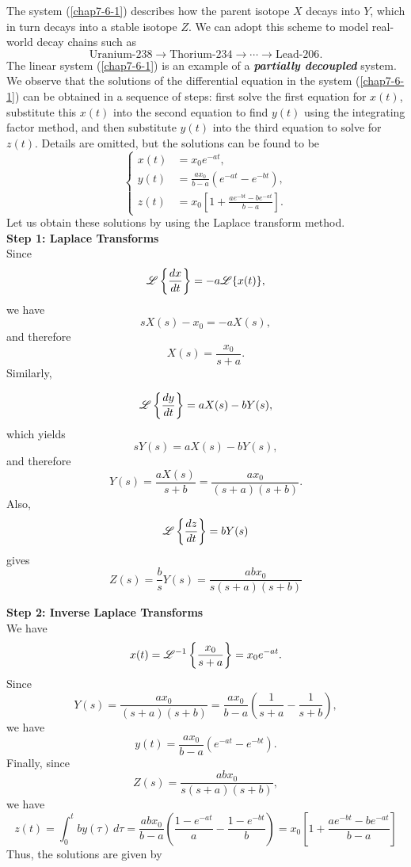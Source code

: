 The system (\ref{chap7-6-1}) describes how the parent isotope \( X \) decays into \( Y \), which in turn decays into a stable isotope \( Z \). We can adopt this scheme to model real-world decay chains such as
\[
\text{Uranium-238} \rightarrow \text{Thorium-234}\rightarrow\cdots \rightarrow \text{Lead-206}.
\]
The linear system (\ref{chap7-6-1}) is an example of a \textbf{\textit{partially decoupled}} system. 
We observe that the  solutions of the differential equation in the system (\ref{chap7-6-1}) can be obtained in a sequence of steps: first solve the first equation for $x(t)$, substitute this $x(t)$ into the second equation to find $y(t)$ using the integrating factor method, and then substitute $y(t)$ into the third equation to solve for $z(t)$. Details are omitted, but the solutions can be found to be 
\[
	\begin{cases}
		x(t) &= x_0 e^{-a t}, \\[6pt]
		y(t) &= \frac{a x_0}{b - a} \left( e^{-a t} - e^{-b t} \right), \\[6pt]
		z(t) &= x_0 \left[ 1 + \frac{a e^{-b t} - b e^{-a t}}{b - a} \right].
	\end{cases}
\]
Let us obtain these solutions  by using the Laplace transform method.\\


\noindent\textbf{Step 1: Laplace Transforms}\\
Since
\[
	\mathscr{L}\left\{\frac{dx}{dt}\right\} = -a \mathscr{L}\{x(t)\},\] we have
	 \[s X(s) - x_0 = -a X(s),\] and therefore
 \[X(s) = \frac{x_0}{s + a}.\]
Similarly,
	
	\[\mathscr{L}\left\{\frac{dy}{dt}\right\} = a X(s) - b Y(s),\] which yields
	\[ s Y(s) = a X(s) - b Y(s),\] and therefore
\[Y(s) = \frac{a X(s)}{s + b} = \frac{a x_0}{(s + a)(s + b)}.\] 
Also, 
	\[\mathscr{L}\left\{\frac{dz}{dt}\right\} = b Y(s)\]  gives
	\[ Z(s) = \frac{b}{s} Y(s) = \frac{a b x_0}{s(s + a)(s + b)}\]


\noindent\textbf{Step 2: Inverse Laplace Transforms}\\
We have
\[
x(t) = \mathscr{L}^{-1}\left\{\frac{x_0}{s + a}\right\} = x_0 e^{-a t}.
\]
Since
\[
Y(s) = \frac{a x_0}{(s + a)(s + b)} 
= \frac{a x_0}{b - a} \left( \frac{1}{s + a} - \frac{1}{s + b} \right),\] we have
\[ y(t) = \frac{a x_0}{b - a} \left( e^{-a t} - e^{-b t} \right).
\]
Finally, since
\[
Z(s) = \frac{a b x_0}{s(s + a)(s + b)},\] we have
\[ z(t) = \int_0^t b y(\tau) \, d\tau 
= \frac{a b x_0}{b - a} \left( \frac{1 - e^{-a t}}{a} - \frac{1 - e^{-b t}}{b} \right)
= x_0 \left[ 1 + \frac{a e^{-b t} - b e^{-a t}}{b - a} \right]
\]
Thus, the solutions are given by


